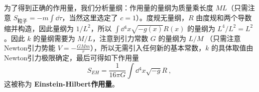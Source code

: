 为了得到正确的作用量，我们分析量纲：作用量的量纲为质量乘长度 $ML$（只需注意 $S_{\text{粒子}}=-m\int\dd\tau$，当然这里选定了 $c=1$）。度规无量纲，$R$ 由度规和两个导数缩并构造，因此量纲为 $1/L^2$，所以 $\int\dd{}^4x\sqrt{-g(x)}R(x)$ 的量纲为 $L^4/L^2=L^2$。因此 $k$ 的量纲需要为 $M/L$，注意到引力常数 $G$ 的量纲为 $L/M$ （只需注意Newton引力势能 $V=-\frac{GMm}{r}$），所以无需引入任何新的基本常数，$k$ 的具体取值由Newton引力极限确定，最后可得如下作用量
\begin{equation}
S_{EH}=\frac{1}{16\pi G}\int\dd{}^4x\sqrt{-g}R~,
\end{equation}
这被称为 \textbf{Einstein-Hilbert作用量}。





























